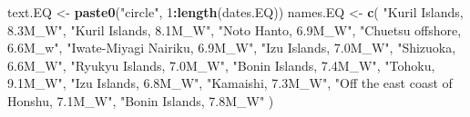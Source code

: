 \documentclass[
]{article}
\newenvironment{Shaded}{\begin{snugshade}}{\end{snugshade}}
\newcommand{\DecValTok}[1]{\textcolor[rgb]{0.00,0.00,0.81}{#1}}
\newcommand{\KeywordTok}[1]{\textcolor[rgb]{0.13,0.29,0.53}{\textbf{#1}}}
\newcommand{\NormalTok}[1]{#1}
\newcommand{\OperatorTok}[1]{\textcolor[rgb]{0.81,0.36,0.00}{\textbf{#1}}}
\newcommand{\StringTok}[1]{\textcolor[rgb]{0.31,0.60,0.02}{#1}}
\begin{document}
\begin{Shaded}
\begin{Highlighting}[]
\NormalTok{text.EQ <-}\StringTok{ }\KeywordTok{paste0}\NormalTok{(}\StringTok{"circle"}\NormalTok{, }\DecValTok{1}\OperatorTok{:}\KeywordTok{length}\NormalTok{(dates.EQ))}
\NormalTok{names.EQ <-}\StringTok{ }\KeywordTok{c}\NormalTok{(}
  \StringTok{"Kuril Islands, 8.3M_W"}\NormalTok{,}
  \StringTok{"Kuril Islands, 8.1M_W"}\NormalTok{,}
  \StringTok{"Noto Hanto, 6.9M_W"}\NormalTok{,}
  \StringTok{"Chuetsu offshore, 6.6M_w"}\NormalTok{,}
  \StringTok{"Iwate-Miyagi Nairiku, 6.9M_W"}\NormalTok{,}
  \StringTok{"Izu Islands, 7.0M_W"}\NormalTok{,}
  \StringTok{"Shizuoka, 6.6M_W"}\NormalTok{,}
  \StringTok{"Ryukyu Islands, 7.0M_W"}\NormalTok{,}
  \StringTok{"Bonin Islands, 7.4M_W"}\NormalTok{,}
  \StringTok{"Tohoku, 9.1M_W"}\NormalTok{,}
  \StringTok{"Izu Islands, 6.8M_W"}\NormalTok{,}
  \StringTok{"Kamaishi, 7.3M_W"}\NormalTok{,}
  \StringTok{"Off the east coast of Honshu, 7.1M_W"}\NormalTok{,}
  \StringTok{"Bonin Islands, 7.8M_W"}
\NormalTok{)}



\end{Highlighting}
\end{Shaded}
\end{document}
